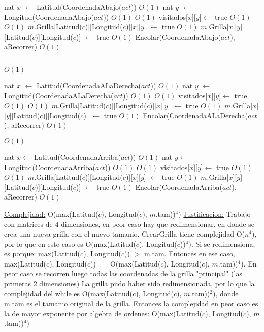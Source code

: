 \begin{Algoritmos}
\begin{algorithmic}[1]
\State nat $x$ $\gets$ Latitud(CoordenadaAbajo($act$))   \Comment $O(1)$
\State nat $y$ $\gets$ Longitud(CoordenadaAbajo($act$))  \Comment $O(1)$
    \Comment $O(1)$
\State visitados[$x$][$y$]$ \gets$ true    \Comment $O(1)$
	 	\Comment $O(1)$
		\State $m$.Grilla[Latitud($c$)][Longitud($c$)][$x$][$y$] $ \gets $ true \Comment $O(1)$
		\State $m$.Grilla[$x$][$y$][Latitud($c$)][Longitud($c$)] $ \gets $ true \Comment $O(1)$
		\State Encolar(CoordenadaAbajo($act$), aRecorrer) \Comment $O(1)$	
	\EndIf
\EndIf
\EndIf

\State $ $


      \Comment $O(1)$

\State nat $x$ $\gets$ Latitud(CoordenadaALaDerecha($act$))   \Comment $O(1)$
\State nat $y$ $\gets$ Longitud(CoordenadaALaDerecha($act$))  \Comment $O(1)$
    \Comment $O(1)$
\State visitados[$x$][$y$]$ \gets$ true    \Comment $O(1)$
	 	\Comment $O(1)$
		\State $m$.Grilla[Latitud($c$)][Longitud($c$)][$x$][$y$] $ \gets $ true \Comment $O(1)$
		\State $m$.Grilla[$x$][$y$][Latitud($c$)][Longitud($c$)] $ \gets $ true \Comment $O(1)$
		\State Encolar(CoordenadaALaDerecha($act$), aRecorrer) \Comment $O(1)$	
	\EndIf
\EndIf
\EndIf
\State $ $

      \Comment $O(1)$

\State nat $x \gets$ Latitud(CoordenadaArriba($act$))   \Comment $O(1)$
\State nat $y \gets$ Longitud(CoordenadaArriba($act$))  \Comment $O(1)$
    \Comment $O(1)$
\State visitados[$x$][$y$]$ \gets$ true    \Comment $O(1)$
	 	\Comment $O(1)$
		\State $m$.Grilla[Latitud($c$)][Longitud($c$)][$x$][$y$] $ \gets $ true \Comment $O(1)$
		\State $m$.Grilla[$x$][$y$][Latitud($c$)][Longitud($c$)] $ \gets $ true \Comment $O(1)$
		\State Encolar(CoordenadaArriba($act$), aRecorrer) \Comment $O(1)$	
	\EndIf
\EndIf
\EndIf

\EndWhile

\medskip
\Statex \underline{Complejidad:} O(max(Latitud($c$), Longitud($c$), $m$.tam))$^4$)
\Statex \underline{Justificacion:} Trabajo con matrices de 4 dimensiones, en peor caso hay que redimensionar, en donde se crea una nueva grilla con el nuevo tamanio. CrearGrilla tiene complejidad O($n^4$), por lo que en este caso es O(max(Latitud($c$), Longitud($c$))$^4$). Si se redimensiona, es porque:  max(Latitud($c$), Longitud($c$)) $> $ m.tam. Entonces en ese caso,  max(Latitud($c$), Longitud($c$)) $=$ O(max(Latitud($c$), Longitud($c$), $m$.tam))$^4$). 
\Statex En peor caso se recorren luego todas las coordenadas de la grilla "principal" (las primeras 2 dimensiones) La grilla pudo haber sido redimensionada, por lo que la complejidad del while es O(max(Latitud($c$), Longitud($c$), $m$.tam))$^2$), donde m.tam es el tamanio original de la grilla. Entonces la complejidad en peor caso es la de mayor exponente por algebra de ordenes: O(max(Latitud($c$), Longitud($c$), $m$.tam))$^4$)



\end{algorithmic}
\end{Algoritmos}
